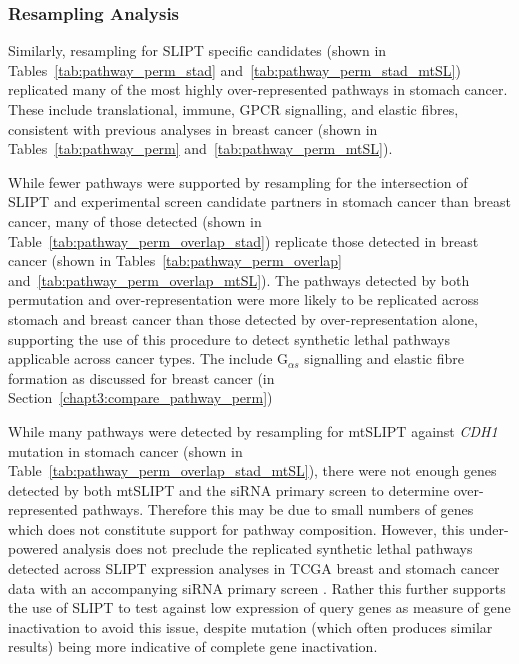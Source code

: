 \FloatBarrier

\subsubsection{Resampling Analysis}  \label{chapt3:compare_pathway_perm_stad_SL}

Similarly, resampling for \gls{SLIPT} specific candidates (shown in Tables~\ref{tab:pathway_perm_stad} and~\ref{tab:pathway_perm_stad_mtSL}) replicated many of the most highly over-represented pathways in stomach cancer. These include translational, immune, GPCR signalling, and elastic fibres, consistent with previous analyses in breast cancer (shown in Tables~\ref{tab:pathway_perm} and~\ref{tab:pathway_perm_mtSL}).

While fewer pathways were supported by resampling for the intersection of \gls{SLIPT} and experimental screen \citep{Telford2015} candidate partners in stomach cancer than breast cancer, many of those detected (shown in Table~\ref{tab:pathway_perm_overlap_stad}) replicate those detected in breast cancer (shown in Tables~\ref{tab:pathway_perm_overlap} and~\ref{tab:pathway_perm_overlap_mtSL}). The pathways detected by both permutation and over-representation were more likely to be replicated across stomach and breast cancer than those detected by over-representation alone, supporting the use of this procedure to detect synthetic lethal pathways applicable across cancer types. The include G$_{\alpha s}$ signalling and elastic fibre formation as discussed for breast cancer (in Section~\ref{chapt3:compare_pathway_perm})

While many pathways were detected by resampling for mtSLIPT against \textit{CDH1} mutation in stomach cancer (shown in Table~\ref{tab:pathway_perm_overlap_stad_mtSL}), there were not enough genes detected by both mtSLIPT and the siRNA primary screen to determine over-represented pathways. Therefore this may be due to small numbers of genes which does not constitute support for pathway composition. However, this under-powered analysis does not preclude the replicated synthetic lethal pathways detected across \gls{SLIPT} expression analyses in TCGA breast and stomach cancer data with an accompanying siRNA primary screen \citep{Telford2015}. Rather this further supports the use of \gls{SLIPT} to test against low expression of query genes as measure of gene inactivation to avoid this issue, despite mutation (which often produces similar results) being more indicative of complete gene inactivation.

